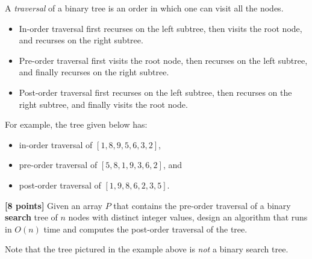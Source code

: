 \documentclass{article}
\begin{document}
\setcounter{question}{2}

\begin{Question}
A \emph{traversal} of a binary tree is an order in which one can visit all the nodes.
\begin{itemize}
    \item In-order traversal first recurses on the left subtree, then visits the root node, and recurses on the right subtree.
    \item Pre-order traversal first visits the root node, then recurses on the left subtree, and finally recurses on the right subtree.
    \item Post-order traversal first recurses on the left subtree, then recurses on the right subtree, and finally visits the root node.
\end{itemize} 

For example, the tree given below has:
\begin{itemize}
    \item in-order traversal of $[1, 8, 9, 5, 6, 3, 2]$,
    \item pre-order traversal of $[5, 8, 1, 9, 3, 6, 2]$, and
    \item post-order traversal of $[1, 9, 8, 6, 2, 3, 5]$.
\end{itemize}

\begin{center}
\end{center}

\begin{Subquestion}
\textbf{[8 points]} Given an array $P$ that contains the pre-order traversal of a binary \textbf{search} tree of $n$ nodes with distinct integer values, design an algorithm that runs in $O(n)$ time and computes the post-order traversal of the tree.

\begin{clar}
Note that the tree pictured in the example above is \emph{not} a binary search tree.
\end{clar}


\end{Subquestion}
\end{Question}
\end{document}
